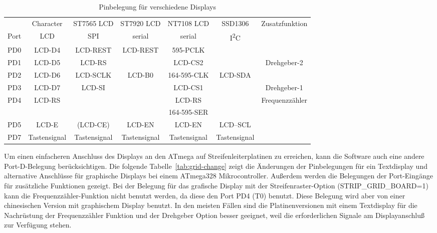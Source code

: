 \begin{table}[H] \small
  \begin{center}
    \begin{tabular}{| c || c | c | c | c | c | c |}
    \hline
           & Character     & ST7565 LCD & ST7920 LCD     & NT7108 LCD  & SSD1306     & Zusatzfunktion \\
      Port & LCD           &   SPI      & serial         & serial      &   I\textsuperscript{2}C      & \\
    \hline
    \hline
    PD0    &  LCD-D4       &  LCD-REST  & LCD-REST       & 595-PCLK        &            & \\
    \hline
    PD1    &  LCD-D5       &  LCD-RS    &                & LCD-CS2     &             & Drehgeber-2 \\
    \hline
    PD2    &  LCD-D6       &  LCD-SCLK  & LCD-B0         & 164-595-CLK &  LCD-SDA    & \\
    \hline
    PD3    &  LCD-D7       &  LCD-SI    &                & LCD-CS1     &             & Drehgeber-1 \\
    \hline
    PD4    &  LCD-RS       &            &                & LCD-RS      &             & Frequenzzähler \\
           &               &            &                & 164-595-SER &             &                \\
    \hline
    PD5    &  LCD-E        &  (LCD-CE)  & LCD-EN         & LCD-EN      &   LCD--SCL  & \\
    \hline
    PD7    & Tastensignal & Tastensignal & Tastensignal  & Tastensignal & Tastensignal & \\
    \hline
    \end{tabular}
  \end{center}
  \caption{Pinbelegung für verschiedene Displays}
\label{tab:display-con}
\end{table}

Um einen einfacheren Anschluss des Displays an den ATmega auf Streifenleiterplatinen zu erreichen,
kann die Software auch eine andere Port-D-Belegung berücksichtigen.
Die folgende Tabelle~\ref{tab:grid-change} zeigt die Änderungen der Pinbelegungen für ein Textdisplay und 
alternative Anschlüsse für graphische Displays bei einem ATmega328 Mikrocontroller.
Außerdem werden die Belegungen der Port-Eingänge für zusätzliche Funktionen gezeigt. 
Bei der Belegung für das grafische Display mit der Streifenraster-Option (STRIP\_GRID\_BOARD=1)
kann die Frequenzzähler-Funktion nicht benutzt werden, da diese den Port PD4 (T0) benutzt.
Diese Belegung wird aber von einer chinesischen Version mit graphischem Display benutzt.
In den meisten Fällen sind die Platinenversionen mit einem Textdisplay für die Nachrüstung der
Frequenzzähler Funktion und der Drehgeber Option besser geeignet, weil die erforderlichen
Signale am Displayanschluß zur Verfügung stehen. 


